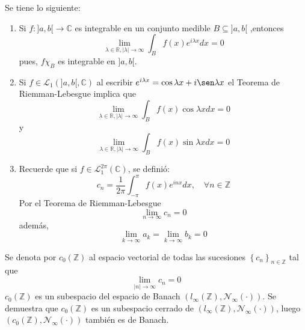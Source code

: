 \documentclass[12pt]{report}
\theoremstyle{largebreak}
\newcommand\cf[3]{\ensuremath{#1:#2\rightarrow#3}}
\newcommand{\N}[2]{\ensuremath{\mathcal{N}_{#1}\left(#2\right)}}
\begin{document}
    \begin{obs}
        Se tiene lo siguiente:
        \begin{enumerate}
            \item Si $\cf{f}{]a,b[}{\mathbb{C}}$ es integrable en un conjunto medible $B\subseteq ]a,b[$ ,entonces
            \begin{equation*}
                \lim_{\lambda\in\mathbb{R},|\lambda|\rightarrow\infty }\int_Bf(x)e^{ i\lambda x}dx=0
            \end{equation*}
            pues, $f\chi_B$ es integrable en $]a,b[$.
            \item Si $f\in\mathcal{L}_1(]a,b[,\mathbb{C})$ al escribir $e^{ i\lambda x}=\cos \lambda x+i\sen \lambda x$ el Teorema de Riemman-Lebesgue implica que
            \begin{equation*}
                \lim_{\lambda\in\mathbb{R},|\lambda|\rightarrow\infty }\int_Bf(x)\cos \lambda x dx=0
            \end{equation*}
            y
            \begin{equation*}
                \lim_{\lambda\in\mathbb{R},|\lambda|\rightarrow\infty }\int_Bf(x)\sin \lambda x dx=0
            \end{equation*}
            \item Recuerde que si $f\in\mathcal{L}_1^{2\pi}(\mathbb{C})$, se definió:
            \begin{equation*}
                c_n=\frac{1}{2\pi}\int_{-\pi}^\pi f(x)e^{ inx}dx,\quad\forall n\in\mathbb{Z}
            \end{equation*}
            Por el Teorema de Riemman-Lebesgue
            \begin{equation*}
                \lim_{ n\rightarrow\infty}c_n=0
            \end{equation*}
            además,
            \begin{equation*}
                \lim_{ k\rightarrow\infty}a_k=\lim_{ k\rightarrow\infty}b_k=0
            \end{equation*}
        \end{enumerate}
    \end{obs}

    Se denota por $c_0(\mathbb{Z})$ al espacio vectorial de todas las sucesiones $\left\{c_n \right\}_{ n\in\mathbb{Z}}$ tal que
    \begin{equation*}
        \lim_{|n| \rightarrow\infty}c_n=0
    \end{equation*}
    $c_0(\mathbb{Z})$ es un subespacio del espacio de Banach $(l_\infty(\mathbb{Z}),\N{\infty}{\cdot})$. Se demuestra que $c_0(\mathbb{Z})$ es un subespacio cerrado de $(l_\infty(\mathbb{Z}),\N{\infty}{\cdot})$, luego $(c_0(\mathbb{Z}),\N{\infty}{\cdot})$ también es de Banach.
\end{document}
